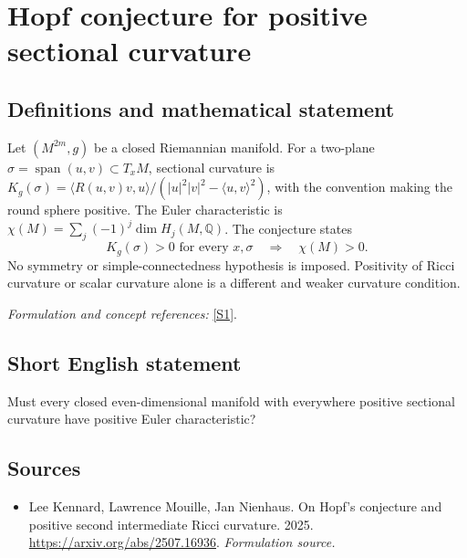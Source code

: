 \documentclass[11pt]{article}
\begin{document}
\section*{\texorpdfstring{Hopf conjecture for positive sectional curvature}{Hopf conjecture for positive sectional curvature}}\label{211}
\subsection{Definitions and mathematical statement}
Let $(M^{2m},g)$ be a closed Riemannian manifold. For a two-plane $\sigma=\operatorname{span}(u,v)\subset T_xM$, sectional curvature is
$K_g(\sigma)=\langle R(u,v)v,u\rangle/(|u|^2|v|^2-\langle u,v\rangle^2)$, with the convention making the round sphere positive. The Euler characteristic is
$\chi(M)=\sum_j(-1)^j\dim H_j(M,{\mathbb{Q}})$. The conjecture states
\[
 K_g(\sigma)>0\text{ for every }x,\sigma
 \quad\Longrightarrow\quad\chi(M)>0.
\]
No symmetry or simple-connectedness hypothesis is imposed. Positivity of Ricci curvature or scalar curvature alone is a different and weaker curvature condition.
\par\smallskip\textit{Formulation and concept references:} \href{https://arxiv.org/abs/2507.16936}{[S1]}.

\subsection{Short English statement}
Must every closed even-dimensional manifold with everywhere positive sectional curvature have positive Euler characteristic?
\subsection{Sources}
\begin{itemize}
\item[S1]Lee Kennard, Lawrence Mouille, Jan Nienhaus. On Hopf's conjecture and positive second intermediate Ricci curvature. 2025.
\url{https://arxiv.org/abs/2507.16936}.
\textit{Formulation source.}
\end{itemize}
\end{document}
